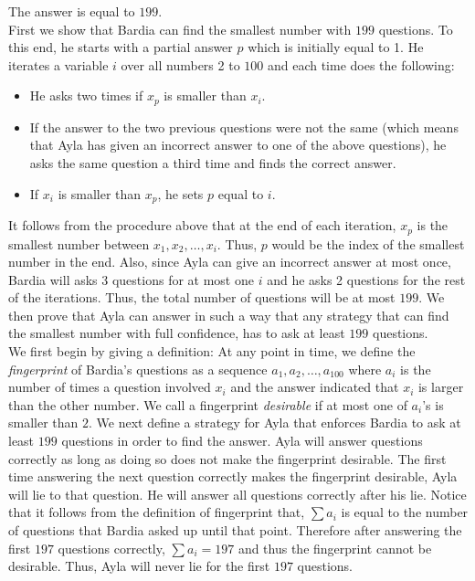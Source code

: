 \begin{solution}
The answer is equal to $199$.\\[0.2cm]

First we show that Bardia can find the smallest number with $199$ questions. To this end, he starts with a partial answer $p$ which is initially equal to 1. He iterates a variable $i$ over all numbers 2 to $100$ and each time does the following:
\begin{itemize}
	\item He asks two times if $x_p$ is smaller than $x_i$.
	\item If the answer to the two previous questions were not the same (which means that Ayla has given an incorrect answer to one of the above questions), he asks the same question a third time and finds the correct answer.
	\item If $x_i$ is smaller than $x_p$, he sets $p$ equal to $i$.
\end{itemize}

It follows from the procedure above that at the end of each iteration, $x_p$ is the smallest number between $x_1, x_2, \ldots, x_i$. Thus, $p$ would be the index of the smallest number in the end. Also, since Ayla can give an incorrect answer at most once, Bardia will asks 3 questions for at most one $i$ and he asks 2 questions for the rest of the iterations. Thus, the total number of questions will be at most $199$. We then prove that Ayla can answer in such a way that any strategy that can find the smallest number with full confidence, has to ask at least $199$ questions.\\[0.2cm]

We first begin by giving a definition: At any point in time, we define the \textit{fingerprint} of Bardia's questions as a sequence $a_1, a_2, \ldots, a_{100}$ where $a_i$ is the number of times a question involved $x_i$ and the answer indicated that $x_i$ is larger than the other number. We call a fingerprint \textit{desirable} if at most one of $a_i$'s is smaller than $2$. We next define a strategy for Ayla that enforces Bardia to ask at least $199$ questions in order to find the answer. Ayla will answer questions correctly as long as doing so does not make the fingerprint desirable. The first time answering the next question correctly makes the fingerprint desirable, Ayla will lie to that question. He will answer all questions correctly after his lie. Notice that it follows from the definition of fingerprint that, $\sum a_i$ is equal to the number of questions that Bardia asked up until that point. Therefore after answering the first $197$ questions correctly, $\sum a_i = 197$ and thus the fingerprint cannot be desirable. Thus, Ayla will never lie for the first $197$ questions.


\end{solution}
